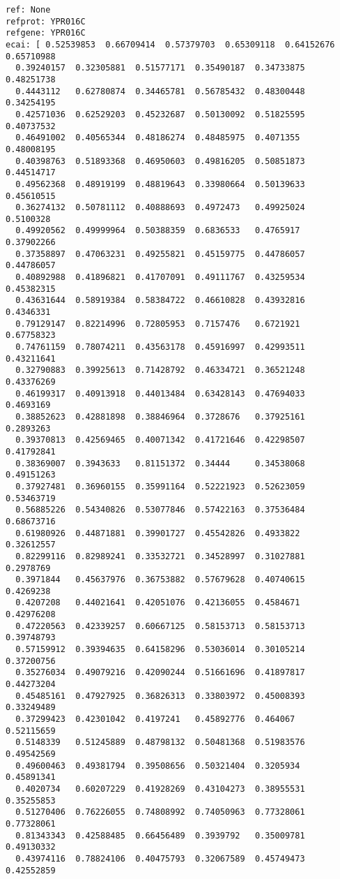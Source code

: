 \documentclass[11pt]{article}
\begin{document}
\begin{Verbatim}[commandchars=\\\{\}]
ref: None
refprot: YPR016C
refgene: YPR016C
ecai: [ 0.52539853  0.66709414  0.57379703  0.65309118  0.64152676  0.65710988
  0.39240157  0.32305881  0.51577171  0.35490187  0.34733875  0.48251738
  0.4443112   0.62780874  0.34465781  0.56785432  0.48300448  0.34254195
  0.42571036  0.62529203  0.45232687  0.50130092  0.51825595  0.40737532
  0.46491002  0.40565344  0.48186274  0.48485975  0.4071355   0.48008195
  0.40398763  0.51893368  0.46950603  0.49816205  0.50851873  0.44514717
  0.49562368  0.48919199  0.48819643  0.33980664  0.50139633  0.45610515
  0.36274132  0.50781112  0.40888693  0.4972473   0.49925024  0.5100328
  0.49920562  0.49999964  0.50388359  0.6836533   0.4765917   0.37902266
  0.37358897  0.47063231  0.49255821  0.45159775  0.44786057  0.44786057
  0.40892988  0.41896821  0.41707091  0.49111767  0.43259534  0.45382315
  0.43631644  0.58919384  0.58384722  0.46610828  0.43932816  0.4346331
  0.79129147  0.82214996  0.72805953  0.7157476   0.6721921   0.67758323
  0.74761159  0.78074211  0.43563178  0.45916997  0.42993511  0.43211641
  0.32790883  0.39925613  0.71428792  0.46334721  0.36521248  0.43376269
  0.46199317  0.40913918  0.44013484  0.63428143  0.47694033  0.4693169
  0.38852623  0.42881898  0.38846964  0.3728676   0.37925161  0.2893263
  0.39370813  0.42569465  0.40071342  0.41721646  0.42298507  0.41792841
  0.38369007  0.3943633   0.81151372  0.34444     0.34538068  0.49151263
  0.37927481  0.36960155  0.35991164  0.52221923  0.52623059  0.53463719
  0.56885226  0.54340826  0.53077846  0.57422163  0.37536484  0.68673716
  0.61980926  0.44871881  0.39901727  0.45542826  0.4933822   0.32612557
  0.82299116  0.82989241  0.33532721  0.34528997  0.31027881  0.2978769
  0.3971844   0.45637976  0.36753882  0.57679628  0.40740615  0.4269238
  0.4207208   0.44021641  0.42051076  0.42136055  0.4584671   0.42976208
  0.47220563  0.42339257  0.60667125  0.58153713  0.58153713  0.39748793
  0.57159912  0.39394635  0.64158296  0.53036014  0.30105214  0.37200756
  0.35276034  0.49079216  0.42090244  0.51661696  0.41897817  0.44273204
  0.45485161  0.47927925  0.36826313  0.33803972  0.45008393  0.33249489
  0.37299423  0.42301042  0.4197241   0.45892776  0.464067    0.52115659
  0.5148339   0.51245889  0.48798132  0.50481368  0.51983576  0.49542569
  0.49600463  0.49381794  0.39508656  0.50321404  0.3205934   0.45891341
  0.4020734   0.60207229  0.41928269  0.43104273  0.38955531  0.35255853
  0.51270406  0.76226055  0.74808992  0.74050963  0.77328061  0.77328061
  0.81343343  0.42588485  0.66456489  0.3939792   0.35009781  0.49130332
  0.43974116  0.78824106  0.40475793  0.32067589  0.45749473  0.42552859

\end{Verbatim}
\end{document}
